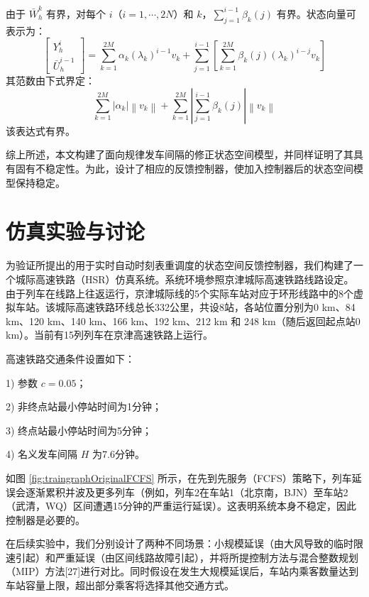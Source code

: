 由于 $\bar{W}_{h}^{k}$ 有界，对每个 $i$（$i=1,\cdots,2N$）和 $k$，$\sum_{j=1}^{i-1} \beta_{k}(j)$ 有界。状态向量可表示为：
\begin{equation*}
	\left[\begin{array}{c}
		Y_{h}^{i} \\
		\bar{U}_{h}^{i-1}
	\end{array}\right]=\sum_{k=1}^{2 M} \alpha_{k}\left(\lambda_{k}\right)^{i-1} v_{k}+\sum_{j=1}^{i-1}\left[\sum_{k=1}^{2 M} \beta_{k}(j)\left(\lambda_{k}\right)^{i-j} v_{k}\right]
\end{equation*}
其范数由下式界定：
\begin{equation*}
	\sum_{k=1}^{2 M}\left|\alpha_{k}\right|\left\|v_{k}\right\|+\sum_{k=1}^{2 M}\left|\sum_{j=1}^{i-1} \beta_{k}(j)\right|\left\|v_{k}\right\|
\end{equation*}
该表达式有界。

综上所述，本文构建了面向规律发车间隔的修正状态空间模型，并同样证明了其具有固有不稳定性。为此，设计了相应的反馈控制器，使加入控制器后的状态空间模型保持稳定。

\section{仿真实验与讨论}
为验证所提出的用于实时自动时刻表重调度的状态空间反馈控制器，我们构建了一个城际高速铁路（HSR）仿真系统。系统环境参照京津城际高速铁路线路设定。由于列车在线路上往返运行，京津城际线的5个实际车站对应于环形线路中的8个虚拟车站。该城际高速铁路环线总长332公里，共设8站，各站位置分别为0 km、84 km、120 km、140 km、166 km、192 km、212 km 和 248 km（随后返回起点站0 km）。当前有15列列车在京津高速铁路上运行。

高速铁路交通条件设置如下：

1) 参数 $c = 0.05$；

2) 非终点站最小停站时间为1分钟；

3) 终点站最小停站时间为5分钟；

4) 名义发车间隔 $H$ 为7.6分钟。

如图 \ref{fig:traingraphOriginalFCFS} 所示，在先到先服务（FCFS）策略下，列车延误会逐渐累积并波及更多列车（例如，列车2在车站1（北京南，BJN）至车站2（武清，WQ）区间遭遇15分钟的严重运行延误）。这表明系统本身不稳定，因此控制器是必要的。

在后续实验中，我们分别设计了两种不同场景：小规模延误（由大风导致的临时限速引起）和严重延误（由区间线路故障引起），并将所提控制方法与混合整数规划（MIP）方法[27]进行对比。同时假设在发生大规模延误后，车站内乘客数量达到车站容量上限，超出部分乘客将选择其他交通方式。

